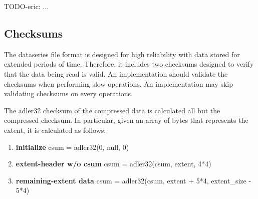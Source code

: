 TODO-eric: ...

\subsection{Checksums}
\label{sec:ff:checksums}

The dataseries file format is designed for high reliability with data
stored for extended periods of time.  Therefore, it includes two
checksums designed to verify that the data being read is valid.  An
implementation should validate the checksums when performing slow
operations.  An implementation may skip validating checksums on every
operations.

The adler32 checksum of the compressed data is calculated all but the
compressed checksum.  In particular, given an array of bytes that
represents the extent, it is calculated as follows:

\begin{enumerate}
\item {\bf initialize} csum = adler32(0, null, 0)
\item {\bf extent-header w/o csum} csum = adler32(csum, extent, 4*4)
\item {\bf remaining-extent data} csum = adler32(csum, extent + 5*4, extent\_size - 5*4)
\end{enumerate}


